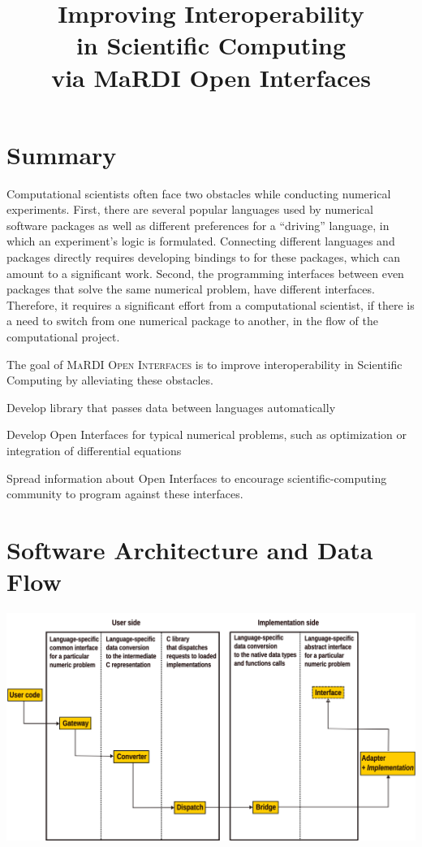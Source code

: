 \documentclass{mmposter}
\title{Improving Interoperability\\in Scientific Computing\\via MaRDI Open Interfaces}
\newcommand{\OIF}{\textsc{MaRDI Open Interfaces}\xspace}
\begin{document}


\maketitle

\section*{Summary}
Computational scientists often face two obstacles while conducting
numerical experiments.
First, there are several popular languages used by numerical
software packages as well as different preferences for a ``driving''
language, in which an experiment's logic is formulated.
Connecting different languages and packages directly requires
developing bindings to for these packages, which can amount
to a significant work.
Second, the programming interfaces between even packages
that solve the same numerical problem, have different interfaces.
Therefore, it requires a significant effort from a computational
scientist, if there is a need to switch from one numerical package
to another, in the flow of the computational project.

The goal of \OIF{} is to improve interoperability in Scientific
Computing by alleviating these obstacles.

\begin{objectives}
  \item Develop library that passes data between languages automatically
  \item Develop Open Interfaces for typical numerical problems,
  such as optimization or integration of differential equations
  \item Spread information about Open Interfaces to encourage
  scientific-computing community to program against these interfaces.
\end{objectives}

\section*{Software Architecture and Data Flow}
\includegraphics[width=\columnwidth]{arch.png}
\end{document}
